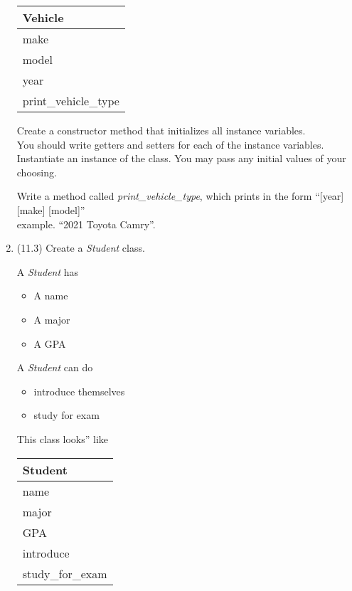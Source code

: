 \documentclass{article}
\newcommand{\tab}{\hspace*{0.25in}}
\newcommand{\csq}[1]{\reflectbox{''}#1''}  %
\begin{document}
\begin{enumerate}
\begin{minipage}{.4\textwidth}
		\vspace*{1em}
		\begin{tabular}{|l|}
			\hline Vehicle\\ \hline
			make\\ model\\ year\\ \hline
			print\_vehicle\_type \\  \hline
		\end{tabular}
	\end{minipage}

	\vspace*{2ex}
	Create a constructor method that initializes all instance variables.\\
	You should write getters and setters for each of the instance variables.\\
	Instantiate an instance of the class. You may pass any initial values of your choosing.

	Write a method called \textit{print\_vehicle\_type}, which prints in the form ``[year] [make] [model]''\\
	example. ``2021 Toyota Camry''.\\



\item (11.3) Create a \textit{Student} class.\\
	\begin{minipage}{.6\textwidth}		
		A \textit{Student} has
		\begin{itemize}
			\item A name
			\item A major
			\item A GPA	
		\end{itemize}
	
		A \textit{Student} can do
		\begin{itemize}
			\item introduce themselves
			\item study for exam
		\end{itemize}
	\end{minipage} 
	\begin{minipage}{.4\textwidth}
		This class \csq{looks} like
		 
		\vspace*{1em}
		\begin{tabular}{|l|}
			\hline Student\\ \hline
			name\\ major\\ GPA\\ \hline
			introduce\\ study\_for\_exam \\  \hline
		\end{tabular}
	\end{minipage}


\end{enumerate}
\end{document}
